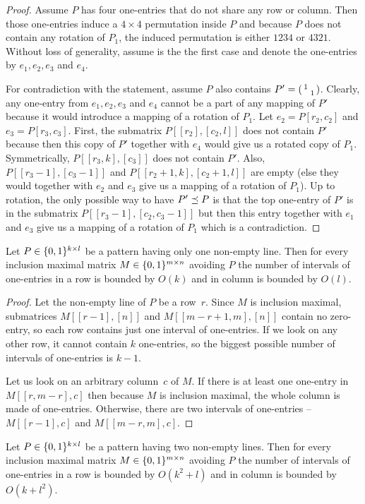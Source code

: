 \begin{proof}
Assume $P$ has four one-entries that do not share any row or column. Then those one-entries induce a $4\times4$ permutation inside $P$ and because $P$ does not contain any rotation of $P_1$, the induced permutation is either $1234$ or $4321$. Without loss of generality, assume is the the first case and denote the one-entries by $e_1,e_2,e_3$ and $e_4$.

For contradiction with the statement, assume $P$ also contains $P'=\left(\begin{smallmatrix}1& \\ &1\end{smallmatrix}\right)$. Clearly, any one-entry from $e_1,e_2,e_3$ and $e_4$ cannot be a part of any mapping of $P'$ because it would introduce a mapping of a rotation of $P_1$. Let $e_2=P[r_2,c_2]$ and $e_3=P[r_3,c_3]$. First, the submatrix $P[[r_2],[c_2,l]]$ does not contain $P'$ because then this copy of $P'$ together with $e_4$ would give us a rotated copy of $P_1$. Symmetrically, $P[[r_3,k],[c_3]]$ does not contain $P'$. Also, $P[[r_3-1],[c_3-1]]$ and $P[[r_2+1,k],[c_2+1,l]]$ are empty (else they would together with $e_2$ and $e_3$ give us a mapping of a rotation of $P_1$). Up to rotation, the only possible way to have $P'\preceq P$ is that the top one-entry of $P'$ is in the submatrix $P[[r_3-1],[c_2,c_3-1]]$ but then this entry together with $e_1$ and $e_3$ give us a mapping of a rotation of $P_1$ which is a contradiction.
\end{proof}
\begin{lemma}
Let $P\in\{0,1\}^{k\times l}$ be a pattern having only one non-empty line. Then for every inclusion maximal matrix $M\in\{0,1\}^{m\times n}$ avoiding $P$ the number of intervals of one-entries in a row is bounded by $O(k)$ and in column is bounded by $O(l)$. 
\end{lemma}
\begin{proof}
Let the non-empty line of $P$ be a row~$r$. Since $M$ is inclusion maximal, submatrices $M[[r-1],[n]]$ and $M[[m-r+1,m],[n]]$ contain no zero-entry, so each row contains just one interval of one-entries. If we look on any other row, it cannot contain $k$ one-entries, so the biggest possible number of intervals of one-entries is $k-1$.

Let us look on an arbitrary column~$c$ of $M$. If there is at least one one-entry in $M[[r,m-r],c]$ then because $M$ is inclusion maximal, the whole column is made of one-entries. Otherwise, there are two intervals of one-entries -- $M[[r-1],c]$ and $M[[m-r,m],c]$.
\end{proof}
\begin{lemma}
Let $P\in\{0,1\}^{k\times l}$ be a pattern having two non-empty lines. Then for every inclusion maximal matrix $M\in\{0,1\}^{m\times n}$ avoiding $P$ the number of intervals of one-entries in a row is bounded by $O(k^2+l)$ and in column is bounded by $O(k+l^2)$. 
\end{lemma}
